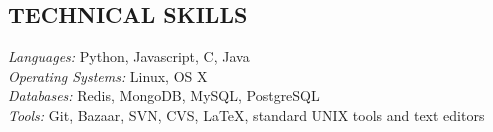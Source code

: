 \documentclass[line,margin]{res}
\begin{document}
\begin{resume}
\section{TECHNICAL SKILLS}
        {\sl Languages:} Python, Javascript, C, Java \\
        {\sl Operating Systems:} Linux, OS X\\
        {\sl Databases:} Redis, MongoDB, MySQL, PostgreSQL \\
        {\sl Tools:} Git, Bazaar, SVN, CVS, \LaTeX, standard UNIX tools and
        text editors 

\end{resume}
\end{document}
